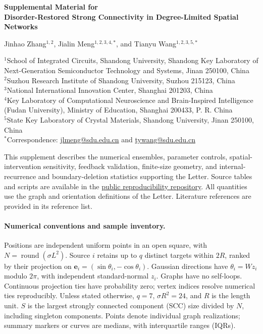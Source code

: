 \documentclass[11pt]{article}
\begin{document}
\begin{center}
{\Large\bfseries Supplemental Material for\\[3pt]
Disorder-Restored Strong Connectivity in Degree-Limited Spatial Networks}\par
\vspace{8pt}
Jinhao Zhang$^{1,2}$, Jialin Meng$^{1,2,3,4,*}$, and Tianyu Wang$^{1,2,3,5,*}$\par
\vspace{6pt}
{\small
$^1$School of Integrated Circuits, Shandong University, Shandong Key Laboratory of Next-Generation Semiconductor Technology and Systems, Jinan 250100, China\\
$^2$Suzhou Research Institute of Shandong University, Suzhou 215123, China\\
$^3$National International Innovation Center, Shanghai 201203, China\\
$^4$Key Laboratory of Computational Neuroscience and Brain-Inspired Intelligence (Fudan University), Ministry of Education, Shanghai 200433, P. R. China\\
$^5$State Key Laboratory of Crystal Materials, Shandong University, Jinan 250100, China\\[4pt]
$^*$Correspondence: \href{mailto:jlmeng@sdu.edu.cn}{jlmeng@sdu.edu.cn} and \href{mailto:tywang@sdu.edu.cn}{tywang@sdu.edu.cn}}
\end{center}
This supplement describes the numerical ensembles, parameter controls, spatial-intervention sensitivity, feedback validation, finite-size geometry, and internal-recurrence and boundary-deletion statistics supporting the Letter. Source tables and scripts are available in the \href{https://github.com/neuromorphicscience-sys/janus-disorder-connectivity/tree/a1869578c4fbabf61fdb863aabb1dc590e646cc6}{public reproducibility repository}. All quantities use the graph and orientation definitions of the Letter. Literature references are provided in its reference list.
\paragraph*{Numerical conventions and sample inventory.}
Positions are independent uniform points in an open square, with $N=\operatorname{round}(\sigma L^2)$. Source $i$ retains up to $q$ distinct targets within $2R$, ranked by their projection on $\bm e_i=(\sin\theta_i,-\cos\theta_i)$. Gaussian directions have $\theta_i=Wz_i$ modulo $2\pi$, with independent standard-normal $z_i$. Graphs have no self-loops. Continuous projection ties have probability zero; vertex indices resolve numerical ties reproducibly. Unless stated otherwise, $q=7$, $\sigma R^2=24$, and $R$ is the length unit. $S$ is the largest strongly connected component (SCC) size divided by $N$, including singleton components. Points denote individual graph realizations; summary markers or curves are medians, with interquartile ranges (IQRs).
\end{document}
